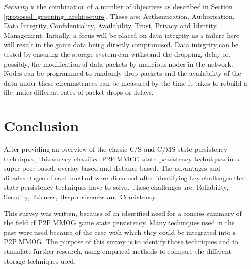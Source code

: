 \documentclass[10pt,a4paper,journal,cspaper,compsoc]{IEEEtran}
\begin{document}
\emph{Security} is the combination of a number of objectives as described in Section \ref{proposed_grouping_architecture}. These are: Authentication,
Authorisation, Data Integrity, Confidentiality, Availability, Trust, Privacy and Identity Management. Initially, a focus will be placed on data
integrity as a failure here will result in the game data being directly compromised. Data integrity can be tested by ensuring the storage system can
withstand the dropping, delay or, possibly, the modification of data packets by malicious nodes in the network. Nodes can be programmed to randomly
drop packets and the availability of the data under these circumstances can be measured by the time it takes to rebuild a file under different rates
of packet drops or delays.


\section{Conclusion}


After providing an overview of the classic C/S and C/MS state persistency techniques, this survey classified P2P MMOG state persistency techniques
into super peer based, overlay based and distance based. The advantages and disadvantages of each method were discussed after identifying key
challenges that state persistency techniques have to solve. These challenges are: Reliability, Security, Fairness, Responsiveness and Consistency.

This survey was written, because of an identified need for a concise summary of the field of P2P MMOG game state persistency. Many techniques used in
the past were used because of the ease with which they could be integrated into a P2P MMOG. The purpose of this survey is to identify those
techniques and to stimulate further research, using empirical methods to compare the different storage techniques used.




\end{document}
